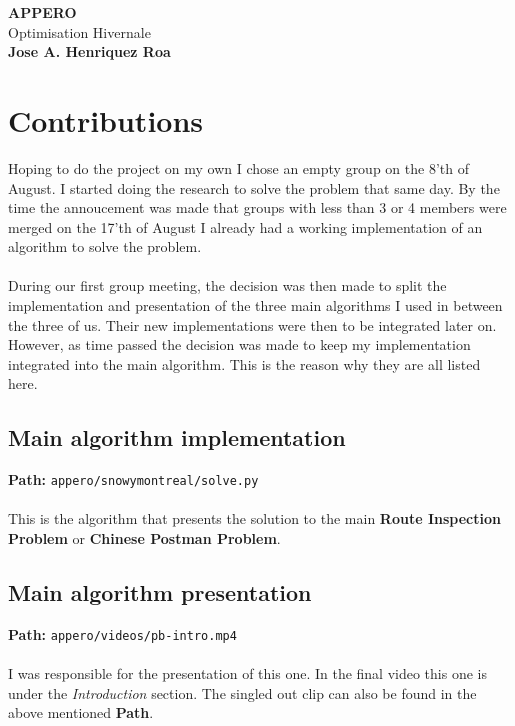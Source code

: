 \documentclass[11pt]{article}
\begin{document}
\begin{titlepage}
  \begin{center}
    \vspace*{1cm}
    \Huge
    \textbf{APPERO}\\
    \vspace{0.4cm}
    Optimisation Hivernale\\
    \vspace{5cm}
    \textbf{Jose A. Henriquez Roa}
    \newpage
    \normalsize
    \tableofcontents
    \newpage
  \end{center}
\end{titlepage}

\section{Contributions}
Hoping to do the project on my own I chose an empty group on the 8'th of August.
I started doing the research to solve the problem that same day. By the time the
annoucement was made that groups with less than 3 or 4 members were merged on
the 17'th of August I already had a working implementation of an algorithm to
solve the problem.\\\\
During our first group meeting, the decision was then made to split the
implementation and presentation of the three main algorithms I used in between
the three of us. Their new implementations were then to be integrated later on.
However, as time passed the decision was made to keep my implementation
integrated into the main algorithm. This is the reason why they are all listed
here.
\subsection{Main algorithm implementation}
\textbf{Path:} \texttt{appero/snowymontreal/solve.py}\\\\
This is the algorithm that presents the solution to the main
\textbf{Route Inspection Problem} or \textbf{Chinese Postman Problem}.
\subsection{Main algorithm presentation}
\textbf{Path:} \texttt{appero/videos/pb-intro.mp4}\\\\
I was responsible for the presentation of this one. In the final video this one
is under the \textit{Introduction} section. The singled out clip can also be
found in the above mentioned \textbf{Path}.
\end{document}
